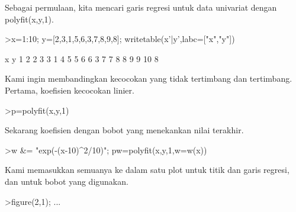 \documentclass[a4paper,10pt]{article}
\begin{document}
\begin{eulernotebook}
\begin{eulercomment}
\begin{eulercomment}
\begin{eulercomment}
\begin{eulercomment}
\begin{eulercomment}
\begin{eulercomment}
\begin{eulercomment}
\begin{eulercomment}
\begin{eulercomment}
\begin{eulercomment}
\begin{eulercomment}
\begin{eulercomment}
\begin{eulercomment}
\begin{eulercomment}
\begin{eulercomment}
\begin{eulercomment}
\begin{eulercomment}
\begin{eulercomment}
\begin{eulercomment}
\begin{eulercomment}
\begin{eulercomment}
\begin{eulercomment}
\begin{eulercomment}
\begin{eulercomment}
\begin{eulercomment}
\begin{eulercomment}
\begin{eulercomment}
\begin{eulercomment}
\begin{eulercomment}
\begin{eulercomment}
\begin{eulercomment}
\begin{eulercomment}
\begin{eulercomment}
Sebagai permulaan, kita mencari garis regresi untuk data univariat
dengan polyfit(x,y,1).
\end{eulercomment}
\begin{eulerprompt}
>x=1:10; y=[2,3,1,5,6,3,7,8,9,8]; writetable(x'|y',labc=["x","y"])
\end{eulerprompt}
\begin{euleroutput}
           x         y
           1         2
           2         3
           3         1
           4         5
           5         6
           6         3
           7         7
           8         8
           9         9
          10         8
\end{euleroutput}
\begin{eulercomment}
Kami ingin membandingkan kecocokan yang tidak tertimbang dan
tertimbang. Pertama, koefisien kecocokan linier.
\end{eulercomment}
\begin{eulerprompt}
>p=polyfit(x,y,1)
\end{eulerprompt}
\begin{euleroutput}
  [0.733333,  0.812121]
\end{euleroutput}
\begin{eulercomment}
Sekarang koefisien dengan bobot yang menekankan nilai terakhir.
\end{eulercomment}
\begin{eulerprompt}
>w &= "exp(-(x-10)^2/10)"; pw=polyfit(x,y,1,w=w(x))
\end{eulerprompt}
\begin{euleroutput}
  [4.71566,  0.38319]
\end{euleroutput}
\begin{eulercomment}
Kami memasukkan semuanya ke dalam satu plot untuk titik dan garis
regresi, dan untuk bobot yang digunakan.
\end{eulercomment}
\begin{eulerprompt}
>figure(2,1);  ...

\end{eulerprompt}
\end{eulercomment}
\end{eulercomment}
\end{eulercomment}
\end{eulercomment}
\end{eulercomment}
\end{eulercomment}
\end{eulercomment}
\end{eulercomment}
\end{eulercomment}
\end{eulercomment}
\end{eulercomment}
\end{eulercomment}
\end{eulercomment}
\end{eulercomment}
\end{eulercomment}
\end{eulercomment}
\end{eulercomment}
\end{eulercomment}
\end{eulercomment}
\end{eulercomment}
\end{eulercomment}
\end{eulercomment}
\end{eulercomment}
\end{eulercomment}
\end{eulercomment}
\end{eulercomment}
\end{eulercomment}
\end{eulercomment}
\end{eulercomment}
\end{eulercomment}
\end{eulercomment}
\end{eulercomment}
\end{eulernotebook}
\end{document}
